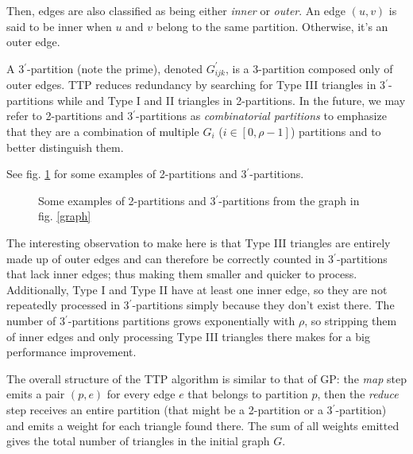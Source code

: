 \documentclass[paper=a4, fontsize=11pt]{scrartcl}
\begin{document}
Then, edges are also classified as being either \emph{inner} or \emph{outer}. An
edge $(u,v)$ is said to be inner when $u$ and $v$ belong to the same partition.
Otherwise, it's an outer edge.

A 3$^\prime$-partition (note the prime), denoted $G^{\prime}_{ijk}$, is a
3-partition composed only of outer edges. TTP reduces redundancy by searching
for Type III triangles in 3$^\prime$-partitions while and Type I and II
triangles in 2-partitions. In the future, we may refer to 2-partitions and
3$^\prime$-partitions as \emph{combinatorial partitions} to emphasize that they
are a combination of multiple $G_i$ ($i\in[0, \rho-1]$) partitions and to better
distinguish them.

See fig. \ref{ttp} for some examples of 2-partitions and 3$^\prime$-partitions.

\begin{figure}[h]
    \centering

    \hspace{20pt}
    \hspace{20pt}

    \par\bigskip

    \hspace{20pt}
    \caption{Some examples of 2-partitions and 3$^\prime$-partitions from the
    graph in fig. \ref{graph}}
    \label{ttp}
\end{figure}

The interesting observation to make here is that Type III triangles are entirely
made up of outer edges and can therefore be correctly counted in
3$^\prime$-partitions that lack inner edges; thus making them smaller and
quicker to process. Additionally, Type I and Type II have at least one inner
edge, so they are not repeatedly processed in 3$^\prime$-partitions simply
because they don't exist there. The number of 3$^\prime$-partitions partitions
grows exponentially with $\rho$, so stripping them of inner edges and only
processing Type III triangles there makes for a big performance improvement.

The overall structure of the TTP algorithm is similar to that of GP: the
\emph{map} step emits a pair $(p, e)$ for every edge $e$ that belongs to
partition $p$, then the \emph{reduce} step receives an entire partition (that
might be a 2-partition or a 3$^\prime$-partition) and emits a weight for each
triangle found there. The sum of all weights emitted gives the total number of
triangles in the initial graph $G$.
\end{document}
